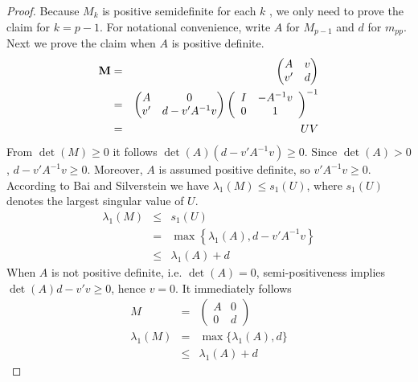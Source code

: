 \documentclass{article}
\begin{document}
\begin{proof}
  Because $M_k$ is positive semidefinite for each $k$ , we only need
  to prove the claim for $k=p-1$. For notational convenience, write
  $A$ for $M_{p-1}$ and $d$ for $m_{pp}$. Next we prove the claim when
  $A$ is positive definite.
  \begin{eqnarray*}
    \mathbf{M} &=&
    \begin{pmatrix}
      A & v \\
      v' & d
    \end{pmatrix} \\
    &=&
    \begin{pmatrix}
      A & 0 \\
      v' & d - v' A^{-1} v
    \end{pmatrix}\left(
      \begin{array}{cc}
        I & -A^{-1} v \\
        0 & 1
      \end{array}\right)^{-1} \\
    &=& U V
  \end{eqnarray*}
  From $\det(M) \geq 0$ it follows $\det(A) (d - v' A^{-1} v) \geq
  0$. Since $\det(A) > 0$, $d - v' A^{-1} v \geq 0$. Moreover, $A$ is
  assumed positive definite, so $v' A^{-1} v \geq 0$. According
  to Bai and Silverstein\cite{BaiSilverstein2010} we have
  $\lambda_1(M) \leq s_1(U)$, where $s_1(U)$ denotes the largest
  singular value of $U$.
  \begin{eqnarray*}
    \lambda_1(M) &\leq& s_1(U) \\
    &=& \max\left\{\lambda_1(A), d - v' A^{-1} v \right\} \\
    &\leq& \lambda_1(A) + d
  \end{eqnarray*}
  When $A$ is not positive definite, i.e. $\det(A)=0$,
  semi-positiveness implies $\det(A) d - v' v \geq 0$, hence $v =
  0$. It immediately follows
  \begin{eqnarray*}
    M &=&
    \begin{pmatrix}
      A & 0 \\
      0 & d
    \end{pmatrix} \\
    \lambda_1(M) &=& \max\{\lambda_1(A), d\} \\
    &\leq& \lambda_1(A) + d
  \end{eqnarray*}




\end{proof}
\end{document}

